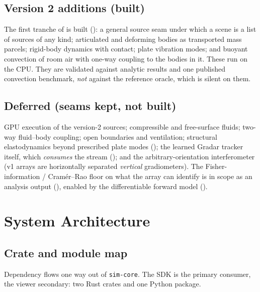 \documentclass[11pt,a4paper]{article}
\theoremstyle{reqstyle}
\begin{document}
\subsection{Version 2 additions (built)}
\label{sec:v2scope}
The first tranche of  is built (): a general source
seam under which a scene is a list of sources of any kind; articulated and deforming bodies
as transported mass parcels; rigid-body dynamics with contact; plate vibration modes; and
buoyant convection of room air with one-way coupling to the bodies in it. These run on the
CPU. They are validated against analytic results and one published convection benchmark,
\emph{not} against the reference oracle, which is silent on them.

\subsection{Deferred (seams kept, not built)}
GPU execution of the version-2 sources; compressible and free-surface fluids; two-way
fluid--body coupling; open boundaries and ventilation; structural elastodynamics beyond
prescribed plate modes (); the
learned Gradar tracker itself, which \emph{consumes} the stream (); and the
arbitrary-orientation interferometer (v1 arrays are horizontally separated \emph{vertical}
gradiometers). The Fisher-information / Cram\'er--Rao floor on what the array can identify is
in scope as an analysis output (), enabled by the differentiable forward
model ().

\section{System Architecture}
\label{sec:arch}

\subsection{Crate and module map}
Dependency flows one way out of \texttt{sim-core}. The SDK is the primary consumer, the
viewer secondary: two Rust crates and one Python package.
\end{document}
